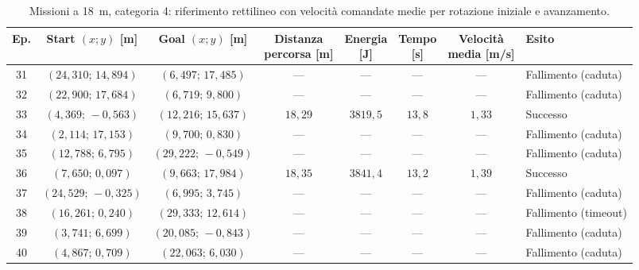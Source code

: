 \begin{table}[H]
\centering
\caption{Missioni a 18~m, categoria 4: riferimento rettilineo con velocità comandate medie per rotazione iniziale e avanzamento.}
\label{tab:big-map-18m-baseline-cat4}
\begingroup
\fontsize{9}{11}\selectfont
\setlength{\tabcolsep}{2.5pt}
\renewcommand{\arraystretch}{1.2}
\begin{tabular}{@{}c cc cccc l@{}}
\toprule
Ep. & \shortstack{Start $(x;y)$\\{}[m]} & \shortstack{Goal $(x;y)$\\{}[m]} & \shortstack{Distanza\\percorsa [m]} & \shortstack{Energia\\{}[J]} & \shortstack{Tempo\\{}[s]} & \shortstack{Velocità\\media [m/s]} & Esito \\
\midrule
31 & $(24{,}310;\,14{,}894)$ & $(6{,}497;\,17{,}485)$ & --- & --- & --- & --- & Fallimento (caduta) \\
32 & $(22{,}900;\,17{,}684)$ & $(6{,}719;\,9{,}800)$ & --- & --- & --- & --- & Fallimento (caduta) \\
33 & $(4{,}369;\,-0{,}563)$ & $(12{,}216;\,15{,}637)$ & $18{,}29$ & $3819{,}5$ & $13{,}8$ & $1{,}33$ & Successo \\
34 & $(2{,}114;\,17{,}153)$ & $(9{,}700;\,0{,}830)$ & --- & --- & --- & --- & Fallimento (caduta) \\
35 & $(12{,}788;\,6{,}795)$ & $(29{,}222;\,-0{,}549)$ & --- & --- & --- & --- & Fallimento (caduta) \\
36 & $(7{,}650;\,0{,}097)$ & $(9{,}663;\,17{,}984)$ & $18{,}35$ & $3841{,}4$ & $13{,}2$ & $1{,}39$ & Successo \\
37 & $(24{,}529;\,-0{,}325)$ & $(6{,}995;\,3{,}745)$ & --- & --- & --- & --- & Fallimento (caduta) \\
38 & $(16{,}261;\,0{,}240)$ & $(29{,}333;\,12{,}614)$ & --- & --- & --- & --- & Fallimento (timeout) \\
39 & $(3{,}741;\,6{,}699)$ & $(20{,}085;\,-0{,}843)$ & --- & --- & --- & --- & Fallimento (caduta) \\
40 & $(4{,}867;\,0{,}709)$ & $(22{,}063;\,6{,}030)$ & --- & --- & --- & --- & Fallimento (caduta) \\
\bottomrule
\end{tabular}
\endgroup
\end{table}
